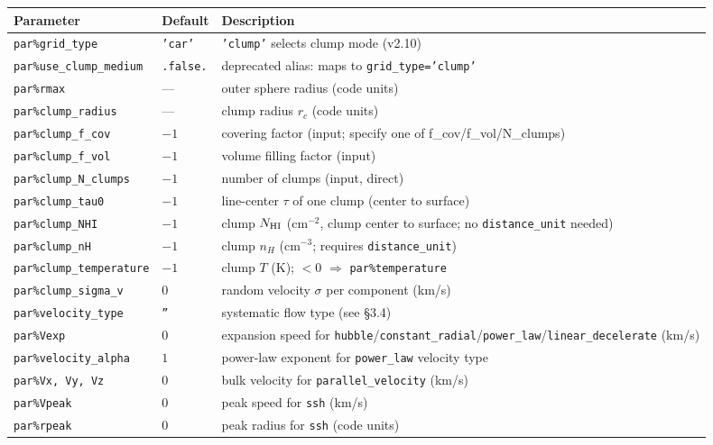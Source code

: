 \documentclass[english,a4paper]{my_memo}
\begin{document}
\begin{tabularx}{\linewidth}{llX}
\hline
Parameter & Default & Description \\
\hline
\texttt{par\%grid\_type}        & \texttt{'car'} & \texttt{'clump'} selects clump mode (v2.10) \\
\texttt{par\%use\_clump\_medium}& \texttt{.false.} & deprecated alias: maps to \texttt{grid\_type='clump'} \\
\texttt{par\%rmax}              & ---  & outer sphere radius (code units) \\
\texttt{par\%clump\_radius}     & ---  & clump radius $r_c$ (code units) \\
\texttt{par\%clump\_f\_cov}     & $-1$ & covering factor (input; specify one of f\_cov/f\_vol/N\_clumps) \\
\texttt{par\%clump\_f\_vol}     & $-1$ & volume filling factor (input) \\
\texttt{par\%clump\_N\_clumps}  & $-1$ & number of clumps (input, direct) \\
\texttt{par\%clump\_tau0}       & $-1$ & line-center $\tau$ of one clump (center to surface) \\
\texttt{par\%clump\_NHI}        & $-1$ & clump $N_{\rm HI}$ (cm$^{-2}$, clump center to surface; no \texttt{distance\_unit} needed) \\
\texttt{par\%clump\_nH}         & $-1$ & clump $n_H$ (cm$^{-3}$; requires \texttt{distance\_unit}) \\
\texttt{par\%clump\_temperature}& $-1$ & clump $T$ (K); $<0$ $\Rightarrow$ \texttt{par\%temperature} \\
\texttt{par\%clump\_sigma\_v}   & $0$  & random velocity $\sigma$ per component (km/s) \\
\texttt{par\%velocity\_type}    & \texttt{''} & systematic flow type (see \S3.4) \\
\texttt{par\%Vexp}              & $0$  & expansion speed for \texttt{hubble}/\texttt{constant\_radial}/\texttt{power\_law}/\texttt{linear\_decelerate} (km/s) \\
\texttt{par\%velocity\_alpha}   & $1$  & power-law exponent for \texttt{power\_law} velocity type \\
\texttt{par\%Vx, Vy, Vz}        & $0$  & bulk velocity for \texttt{parallel\_velocity} (km/s) \\
\texttt{par\%Vpeak}             & $0$  & peak speed for \texttt{ssh} (km/s) \\
\texttt{par\%rpeak}             & $0$  & peak radius for \texttt{ssh} (code units) \\

\end{tabularx}
\end{document}
